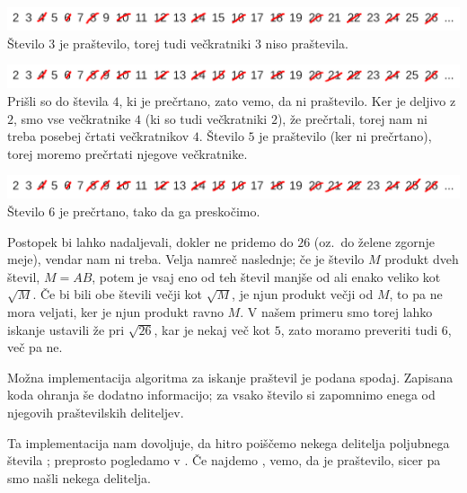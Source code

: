 \noindent
\includegraphics[width=\linewidth]{poglavja/teorija-stevil/slike/reseto2}
Število $3$ je praštevilo, torej tudi večkratniki $3$ niso praštevila.

\noindent
\includegraphics[width=\linewidth]{poglavja/teorija-stevil/slike/reseto3}
Prišli so do števila $4$, ki je prečrtano, zato vemo, da ni praštevilo.
Ker je deljivo z $2$, smo vse večkratnike $4$ (ki so tudi večkratniki $2$), že
prečrtali, torej nam ni treba posebej črtati večkratnikov $4$.
Število $5$ je praštevilo (ker ni prečrtano), torej moremo prečrtati njegove
večkratnike.

\noindent
\includegraphics[width=\linewidth]{poglavja/teorija-stevil/slike/reseto4}
Število $6$ je prečrtano, tako da ga preskočimo.

Postopek bi lahko nadaljevali, dokler ne pridemo do $26$ (oz.~do želene zgornje
meje), vendar nam ni treba.
Velja namreč naslednje; če je število $M$ produkt dveh števil, $M = A B$, potem
je vsaj eno od teh števil manjše od ali enako veliko kot $\sqrt{M}$.
Če bi bili obe števili večji kot $\sqrt{M}$, je njun produkt večji od $M$, to pa
ne mora veljati, ker je njun produkt ravno $M$.
V našem primeru smo torej lahko iskanje ustavili že pri $\sqrt{26}$, kar je
nekaj več kot $5$, zato moramo preveriti tudi $6$, več pa ne.

Možna implementacija algoritma za iskanje praštevil je podana spodaj.
Zapisana koda ohranja še dodatno informacijo; za vsako število si zapomnimo
enega od njegovih praštevilskih deliteljev.


Ta implementacija nam dovoljuje, da hitro poiščemo nekega delitelja poljubnega
števila ; preprosto pogledamo v .
Če najdemo , vemo, da je  praštevilo, sicer pa smo našli nekega
delitelja.

